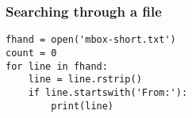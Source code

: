 \begin{frame}[fragile]\frametitle{Searching through a file}
\begin{lstlisting}
fhand = open('mbox-short.txt')
count = 0
for line in fhand:
	line = line.rstrip()
	if line.startswith('From:'):
		print(line)
\end{lstlisting}
\end{frame}
%
%
%
%
%
%
%
%
%


